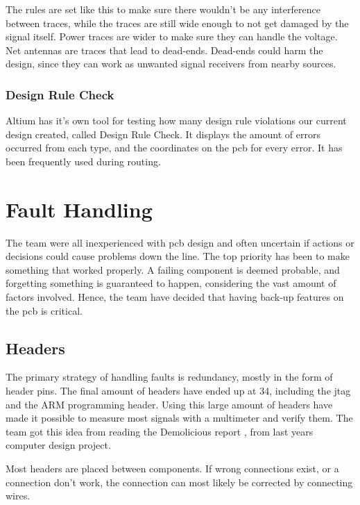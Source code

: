 The rules are set like this to make sure there wouldn't be any interference between traces, while the traces are still wide enough to not get damaged by the signal itself.
Power traces are wider to make sure they can handle the voltage.
Net antennas are traces that lead to dead-ends.
Dead-ends could harm the design, since they can work as unwanted signal receivers from nearby sources.

\subsubsection{Design Rule Check}
Altium has it's own tool for testing how many design rule violations our current design created, called Design Rule Check.
It displays the amount of errors occurred from each type, and the coordinates on the \gls{pcb} for every error.
It has been frequently used during routing.

\section{Fault Handling}
The team were all inexperienced with \gls{pcb} design and often uncertain if actions or decisions could cause problems down the line.
The top priority has been to make something that worked properly.
A failing component is deemed probable, and forgetting something is guaranteed to happen, considering the vast amount of factors involved.
Hence, the team have decided that having back-up features on the \gls{pcb} is critical.

\subsection{Headers}
The primary strategy of handling faults is redundancy, mostly in the form of header pins.
The final amount of headers have ended up at 34, including the \gls{jtag} and the ARM programming header.
Using this large amount of headers have made it possible to measure most signals with a multimeter and verify them.
The team got this idea from reading the Demolicious report \cite{demolicious-report}, from last years computer design project.

Most headers are placed between components.
If wrong connections exist, or a connection don't work, the connection can most likely be corrected by connecting wires.


